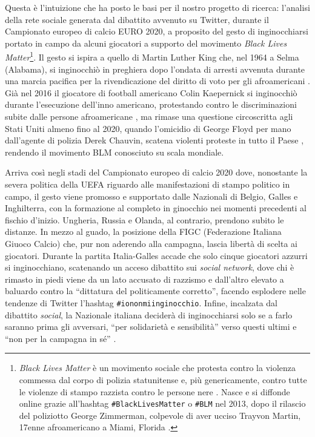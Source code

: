     Questa è l'intuizione che ha posto le basi per il nostro progetto di ricerca: l'analisi della rete sociale generata dal dibattito avvenuto su Twitter, durante il Campionato europeo di calcio EURO 2020, a proposito del gesto  di inginocchiarsi portato in campo da alcuni giocatori a supporto del movimento \textit{Black Lives Matter}\footnote{\textit{Black Lives Matter} è un movimento sociale che protesta contro la violenza commessa dal corpo di polizia statunitense e, più genericamente, contro tutte le violenze di stampo razzista contro le persone nere \citep{mw:blm}. Nasce e si diffonde online grazie all’hashtag \texttt{\#BlackLivesMatter} o \texttt{\#BLM} nel 2013, dopo il rilascio del poliziotto George Zimmerman, colpevole di aver ucciso Trayvon Martin, 17enne afroamericano a Miami, Florida \cite{blm_about}.}. Il gesto si ispira a quello di Martin Luther King che, nel 1964 a Selma (Alabama), si inginocchiò in preghiera dopo l'ondata di arresti avvenuta durante una marcia pacifica per la rivendicazione del diritto di voto per gli afroamericani \cite{knees}. Già nel 2016 il giocatore di football americano Colin Kaepernick si inginocchiò durante l’esecuzione dell’inno americano, protestando contro le discriminazioni subite dalle persone afroamericane \cite{inginocchio}, ma rimase una questione circoscritta agli Stati Uniti almeno fino al 2020, quando l’omicidio di George Floyd per mano dall’agente di polizia Derek Chauvin, scatena violenti proteste in tutto il Paese \cite{protest}, rendendo il movimento BLM conosciuto su scala mondiale. 
      
      Arriva così negli stadi del Campionato europeo di calcio 2020 dove, nonostante la severa politica della UEFA riguardo alle manifestazioni di stampo politico in campo, il gesto viene promosso e supportato dalle Nazionali di Belgio, Galles e Inghilterra, con la formazione al completo in ginocchio nei momenti precedenti al fischio d'inizio. Ungheria, Russia e Olanda, al contrario, prendono subito le distanze. In mezzo al guado, la posizione della FIGC (Federazione Italiana Giuoco Calcio) che, pur non aderendo alla campagna, lascia libertà di scelta ai giocatori. Durante la partita Italia-Galles accade che solo cinque giocatori azzurri si inginocchiano, scatenando un acceso dibattito sui \textit{social network}, dove chi è rimasto in piedi viene da un lato accusato di razzismo e dall’altro elevato a baluardo contro la “dittatura del politicamente corretto”, facendo esplodere nelle tendenze di Twitter l'hashtag \texttt{\#iononmiinginocchio}. Infine, incalzata dal dibattito \textit{social}, la Nazionale italiana deciderà di inginocchiarsi solo se a farlo saranno prima gli avversari, ``per solidarietà e sensibilità'' verso questi ultimi e ``non per la campagna in sé'' \cite{chiellini}. 
      
